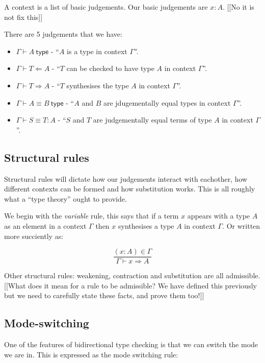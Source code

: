 A context is a list of basic judgements. Our basic judgements are $x : A$. [[No it is not fix this]]

There are 5 judgements that we have:

\begin{itemize}
    \item $\Gamma \vdash A\ \mathsf{type}$ - ``$A$ is a type in context $\Gamma$''.
    \item $\Gamma \vdash T \Leftarrow A$ - ``$T$ can be checked to have type $A$ in context $\Gamma$''.
    \item $\Gamma \vdash T \Rightarrow A$ - ``$T$ synthesises the type $A$ in context $\Gamma$''.
    \item $\Gamma \vdash A \equiv B\ \mathsf{type}$ - ``$A$ and $B$ are jdugementally equal types in context $\Gamma$''.
    \item $\Gamma \vdash S \equiv T : A$ - ``$S$ and $T$ are judgementally equal terms of type $A$ in context $\Gamma$''.
\end{itemize}

\subsection{Structural rules}

Structural rules will dictate how our judgements interact with eachother, how different contexts can be formed and how substitution works. This is all roughly what a ``type theory'' ought to provide.

We begin with the \emph{variable} rule, this says that if a term $x$ appears with a type $A$ as an element in a context $\Gamma$ then $x$ synthesises a type $A$ in context $\Gamma$. Or written more succiently as:

$$
    \frac{(x:A) \in \Gamma }{\Gamma \vdash x \Rightarrow A}
$$

Other structural rules: weakening, contraction and substitution are all admissible. [[What does it mean for a rule to be admissible? We have defined this previously but we need to carefully state these facts, and prove them too!]]

\subsection{Mode-switching}

One of the features of bidirectional type checking is that we can switch the mode we are in. This is expressed as the mode switching rule:

